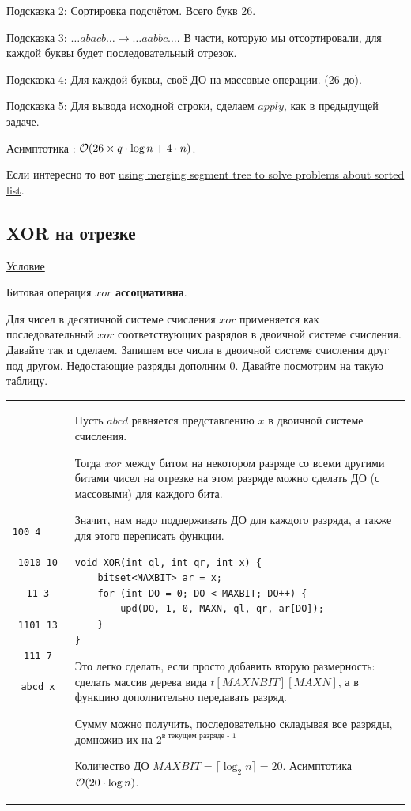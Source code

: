 Подсказка 2: Сортировка подсчётом. Всего букв 26.

Подсказка 3: $\dots abacb \dots  \rightarrow \dots aabbc \dots $. В части, которую мы отсортировали, для каждой буквы будет последовательный отрезок.

Подсказка 4: Для каждой буквы, своё ДО на массовые операции. (26 до).

Подсказка 5: Для вывода исходной строки, сделаем $apply$, как в предыдущей задаче.

Асимптотика : $\mathcal{O}(26 \times q \cdot \log n + 4 \cdot n)$.

Если интересно то вот \href{https://codeforces.com/blog/entry/49446}{using merging segment tree to solve problems about sorted list}.

\subsection{XOR на отрезке}

\href{https://codeforces.com/problemset/problem/242/E}{Условие}

Битовая операция $xor$ {\bf ассоциативна}. 

Для чисел в десятичной системе счисления $xor$ применяется как последовательный $xor$ соответствующих разрядов в двоичной системе счисления. Давайте так и сделаем. Запишем все числа в двоичной системе счисления друг под другом. Недостающие разряды дополним $0$. Давайте посмотрим на такую таблицу. 

\down
\begin{tabular}{cm{}}
	\begin{minipage}{2.5cm}
		\begin{verbatim}
			 100 4    
			1010 10
			  11 3
			1101 13
			 111 7
			abcd x
		\end{verbatim}
	\end{minipage}  
	&
	Пусть $abcd$ равняется представлению $x$ в двоичной системе счисления.
	
	Тогда $xor$ между битом на некотором разряде со всеми другими битами чисел на отрезке на этом разряде можно сделать ДО (с массовыми) для каждого бита.
	
	Значит, нам надо поддерживать ДО для каждого разряда, а также для этого переписать функции.
	
	\up \up
	\begin{verbatim}
void XOR(int ql, int qr, int x) {
	bitset<MAXBIT> ar = x;
	for (int DO = 0; DO < MAXBIT; DO++) {
		upd(DO, 1, 0, MAXN, ql, qr, ar[DO]);
	}
}
	\end{verbatim}
	\up \up
	
	
	Это легко сделать, если просто добавить вторую размерность: сделать массив дерева вида $t[MAXNBIT][MAXN]$,  а в функцию дополнительно передавать разряд.
	
	Сумму можно получить, последовательно складывая все разряды, домножив их на $2^{\text{в текущем разряде - 1}}$
	
	Количество ДО $MAXBIT=\lceil\log_2 n\rceil = 20$. Асимптотика $\mathcal{O}(20 \cdot \log n)$.
\end{tabular}

